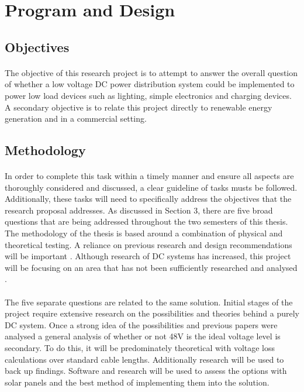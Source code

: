 \section{Program and Design}  


\subsection{Objectives}

\paragraph{}
The objective of this research project is to attempt to answer the overall question of whether a low voltage DC power distribution system could be implemented to power low load devices such as lighting, simple electronics and charging devices. A secondary objective is to relate this project directly to renewable energy generation and in a commercial setting.

\subsection{Methodology}

\paragraph{}
In order to complete this task within a timely manner and ensure all aspects are thoroughly considered and discussed, a clear guideline of tasks musts be followed. Additionally, these tasks will need to specifically address the objectives that the research proposal addresses. As discussed in Section 3, there are five broad questions that are being addressed throughout the two semesters of this thesis. The methodology of the thesis is based around a combination of physical and theoretical testing. A reliance on previous research and design recommendations will be important \cite{Amin2011}. Although research of DC systems has increased, this project will be focusing on an area that has not been sufficiently researched and analysed \cite{Pellis1997}.   

\paragraph{}
The five separate questions are related to the same solution. Initial stages of the project require extensive research on the possibilities and theories behind a purely DC system. Once a strong idea of the possibilities and previous papers were analysed a general analysis of whether or not 48V is the ideal voltage level is secondary. To do this, it will be predominately theoretical with voltage loss calculations over standard cable lengths. Additionally research will be used to back up findings. Software and research will be used to assess the options with solar panels and the best method of implementing them into the solution. 

